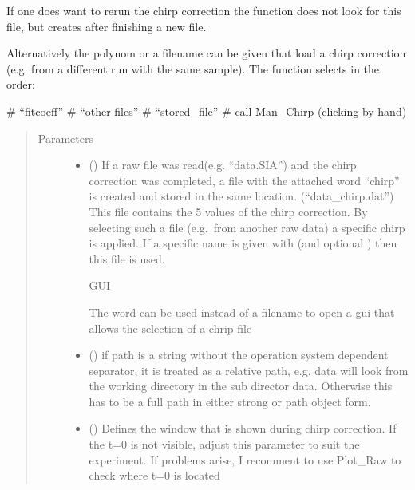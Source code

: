 \documentclass[letterpaper,10pt,english]{sphinxmanual}
\begin{document}
\begin{fulllineitems}
\begin{fulllineitems}
If one does want to re\sphinxhyphen{}run the chirp correction the function  does
not look for this file, but creates after finishing a new file.

Alternatively the polynom or a filename can be given that load a chirp correction
(e.g. from a different run with the same sample).
The function  selects in the order:

\# “fitcoeff”
\# “other files”
\# “stored\_file”
\# call Man\_Chirp (clicking by hand)
\begin{quote}\begin{description}
\item[{Parameters}] \leavevmode\begin{itemize}
\item {} 
 (\sphinxstyleliteralemphasis{\sphinxupquote{, }}) \textendash{} 
If a raw file was read(e.g. “data.SIA”) and the chirp correction was
completed, a file with the attached word “chirp” is created and
stored in the same location. (“data\_chirp.dat”) This file contains
the 5 values of the chirp correction. By selecting such a file
(e.g. from another raw data) a specific chirp is applied. If a
specific name is given with  (and optional )
then this file is used.

GUI

The word  can be used instead of a filename to open a gui that
allows the selection of a chrip file


\item {} 
 (\sphinxstyleliteralemphasis{\sphinxupquote{ (}}\sphinxstyleliteralemphasis{\sphinxupquote{)}}) \textendash{} if path is a string without the operation system dependent separator, it is treated as a relative path,
e.g. data will look from the working directory in the sub director data. Otherwise this has to be a
full path in either strong or path object form.

\item {} 
 (\sphinxstyleliteralemphasis{\sphinxupquote{ (}}\sphinxstyleliteralemphasis{\sphinxupquote{)}}\sphinxstyleliteralemphasis{\sphinxupquote{, }}) \textendash{} Defines the window that is shown during chirp correction. If the t=0 is not visible, adjust this parameter
to suit the experiment. If problems arise, I recomment to use Plot\_Raw to check where t=0 is located


\end{itemize}
\end{description}
\end{quote}
\end{fulllineitems}
\end{fulllineitems}
\end{document}
